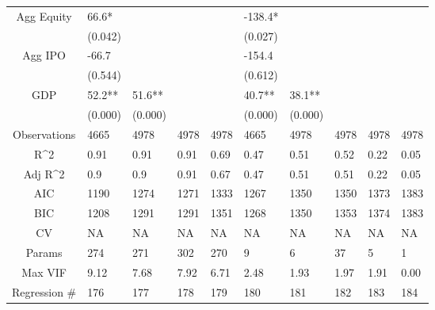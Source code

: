 \documentclass{article}
\begin{document}
\begin{table}[H]
\begin{tabular}{|clllllllll|}
  Agg Equity & 66.6* &  &  &  & -138.4* &  &  &  &  \\ 
   & (0.042) &  &  &  & (0.027) &  &  &  &  \\ 
  Agg IPO & -66.7 &  &  &  & -154.4 &  &  &  &  \\ 
   & (0.544) &  &  &  & (0.612) &  &  &  &  \\ 
  GDP & 52.2** & 51.6** &  &  & 40.7** & 38.1** &  &  &  \\ 
   & (0.000) & (0.000) &  &  & (0.000) & (0.000) &  &  &  \\ 
  \hline 
 Observations & 4665 & 4978 & 4978 & 4978 & 4665 & 4978 & 4978 & 4978 & 4978 \\ 
  R^2 & 0.91 & 0.91 & 0.91 & 0.69 & 0.47 & 0.51 & 0.52 & 0.22 & 0.05 \\ 
  Adj R^2 & 0.9 & 0.9 & 0.91 & 0.67 & 0.47 & 0.51 & 0.51 & 0.22 & 0.05 \\ 
  AIC & 1190 & 1274 & 1271 & 1333 & 1267 & 1350 & 1350 & 1373 & 1383 \\ 
  BIC & 1208 & 1291 & 1291 & 1351 & 1268 & 1350 & 1353 & 1374 & 1383 \\ 
  CV & NA & NA & NA & NA & NA & NA & NA & NA & NA \\ 
  Params & 274 & 271 & 302 & 270 & 9 & 6 & 37 & 5 & 1 \\ 
  Max VIF & 9.12 & 7.68 & 7.92 & 6.71 & 2.48 & 1.93 & 1.97 & 1.91 & 0.00 \\ 
  Regression \# & 176 & 177 & 178 & 179 & 180 & 181 & 182 & 183 & 184 \\ 
   \hline
\end{tabular}
 
\end{table}
\end{document}
